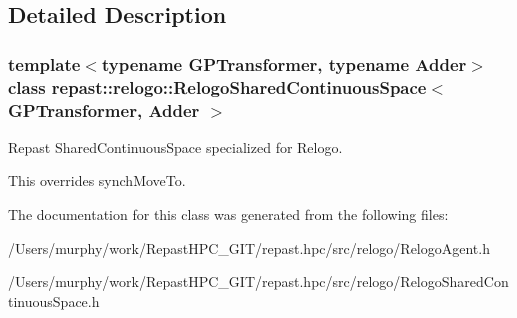 \subsection{Detailed Description}
\subsubsection*{template$<$typename G\-P\-Transformer, typename Adder$>$class repast\-::relogo\-::\-Relogo\-Shared\-Continuous\-Space$<$ G\-P\-Transformer, Adder $>$}

Repast Shared\-Continuous\-Space specialized for Relogo. 

This overrides synch\-Move\-To. 

The documentation for this class was generated from the following files\-:\begin{DoxyCompactItemize}
\item 
/\-Users/murphy/work/\-Repast\-H\-P\-C\-\_\-\-G\-I\-T/repast.\-hpc/src/relogo/Relogo\-Agent.\-h\item 
/\-Users/murphy/work/\-Repast\-H\-P\-C\-\_\-\-G\-I\-T/repast.\-hpc/src/relogo/Relogo\-Shared\-Continuous\-Space.\-h\end{DoxyCompactItemize}
